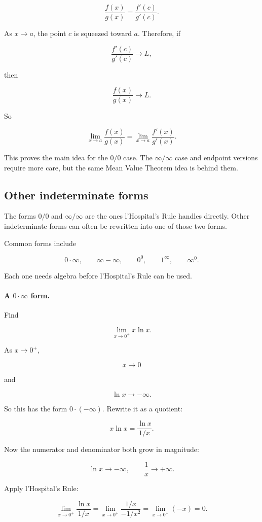 \[
\frac{f(x)}{g(x)}
=
\frac{f'(c)}{g'(c)}.
\]

As \(x\to a\), the point \(c\) is squeezed toward \(a\).  Therefore, if

\[
\frac{f'(c)}{g'(c)}\to L,
\]

then

\[
\frac{f(x)}{g(x)}\to L.
\]

So

\[
\lim_{x\to a}\frac{f(x)}{g(x)}
=
\lim_{x\to a}\frac{f'(x)}{g'(x)}.
\]

This proves the main idea for the \(0/0\) case.  The \(\infty/\infty\) case and endpoint
versions require more care, but the same Mean Value Theorem idea is behind them.

\subsection{Other indeterminate forms}
\label{subsec:other-indeterminate-forms}

The forms \(0/0\) and \(\infty/\infty\) are the ones l'Hospital's Rule handles directly.
Other indeterminate forms can often be rewritten into one of those two forms.

Common forms include

\[
0\cdot\infty,
\qquad
\infty-\infty,
\qquad
0^0,
\qquad
1^\infty,
\qquad
\infty^0.
\]

Each one needs algebra before l'Hospital's Rule can be used.

\paragraph{A \(0\cdot\infty\) form.}
Find

\[
\lim_{x\to0^+}x\ln x.
\]

As \(x\to0^+\),

\[
x\to0
\]

and

\[
\ln x\to-\infty.
\]

So this has the form \(0\cdot(-\infty)\).  Rewrite it as a quotient:

\[
x\ln x=\frac{\ln x}{1/x}.
\]

Now the numerator and denominator both grow in magnitude:

\[
\ln x\to-\infty,
\qquad
\frac1x\to+\infty.
\]

Apply l'Hospital's Rule:

\[
\lim_{x\to0^+}\frac{\ln x}{1/x}
=
\lim_{x\to0^+}
\frac{1/x}{-1/x^2}
=
\lim_{x\to0^+}(-x)
=
0.
\]

